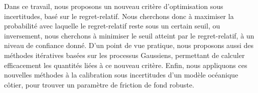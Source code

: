 Dans ce travail, nous proposons un nouveau critère d'optimisation sous
incertitudes, basé sur le regret-relatif. Nous cherchons donc à
maximiser la probabilité avec laquelle le regret-relatif reste sous un
certain seuil, ou inversement, nous cherchons à minimiser le seuil
atteint par le regret-relatif, à un niveau de confiance donné.  D'un
point de vue pratique, nous proposons aussi des méthodes itératives
basées sur les processus Gaussiens, permettant de calculer
efficacement les quantités liées à ce nouveau critère.  Enfin, nous
appliquons ces nouvelles méthodes à la calibration sous incertitudes
d'un modèle océanique côtier, pour trouver un paramètre de friction de
fond robuste.

